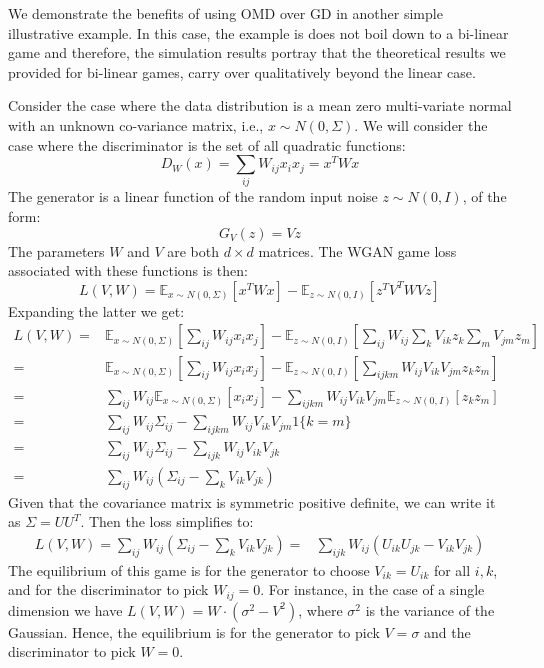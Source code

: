 
We demonstrate the benefits of using OMD over GD in another simple illustrative example. In this case, the example is does not boil down to a bi-linear game and therefore, the simulation results portray that the theoretical results we provided for bi-linear games, carry over qualitatively beyond the linear case.

Consider the case where the data distribution is a mean zero multi-variate normal with an unknown co-variance matrix, i.e., $x \sim N(0, \Sigma)$. We will consider the case where the discriminator is the set of all quadratic functions:
\begin{equation}
D_W(x) = \sum_{ij} W_{ij} x_i x_j = x^T W x 
\end{equation}
The generator is a linear function of the random input noise $z\sim N(0, I)$, of the form:
\begin{equation}
G_V(z) = V z
\end{equation}
The parameters $W$ and $V$ are both $d\times d$ matrices. The WGAN game loss associated with these functions is then:
\begin{equation}
L(V, W)= \mathbb{E}_{x\sim N(0, \Sigma)}\left[ x^T W x \right] - \mathbb{E}_{z\sim N(0,I)}\left[z^T V^T W V z \right] 
\end{equation}
Expanding the latter we get:
\begin{align*}
L(V, W)=& \mathbb{E}_{x\sim N(0, \Sigma)}\left[ \sum_{ij} W_{ij} x_i x_j \right] - \mathbb{E}_{z\sim N(0,I)}\left[ \sum_{ij} W_{ij} \sum_{k} V_{ik} z_k  \sum_{m} V_{jm} z_m\right] \\
=&
\mathbb{E}_{x\sim N(0, \Sigma)}\left[ \sum_{ij} W_{ij} x_i x_j \right] - \mathbb{E}_{z\sim N(0,I)}\left[ \sum_{ijkm} W_{ij} V_{ik} V_{jm} z_k z_m \right]\\
=& \sum_{ij} W_{ij} \mathbb{E}_{x\sim N(0, \Sigma)}\left[ x_i x_j \right] - \sum_{ijkm} W_{ij} V_{ik} V_{jm} \mathbb{E}_{z\sim N(0,I)}\left[ z_k z_m \right]\\
=& \sum_{ij} W_{ij} \Sigma_{ij} - \sum_{ijkm} W_{ij} V_{ik} V_{jm} 1\{k=m\}\\
=& \sum_{ij} W_{ij} \Sigma_{ij} - \sum_{ijk} W_{ij} V_{ik} V_{jk}\\
=& \sum_{ij} W_{ij} \left(\Sigma_{ij} - \sum_{k} V_{ik} V_{jk}\right)
\end{align*}
Given that the covariance matrix is symmetric positive definite, we can write it as $\Sigma = U U^T$. Then the loss simplifies to:
\begin{align}
L(V, W) = \sum_{ij} W_{ij} \left(\Sigma_{ij} - \sum_{k} V_{ik} V_{jk}\right) =& \sum_{ijk} W_{ij} \left(U_{ik} U_{jk} -  V_{ik} V_{jk}\right)
\end{align}
The equilibrium of this game is for the generator to choose $V_{ik} = U_{ik}$ for all $i,k$, and for the discriminator to pick $W_{ij}=0$. For instance, in the case of a single dimension we have $L(V,W) = W\cdot (\sigma^2 - V^2)$, where $\sigma^2$ is the variance of the Gaussian. Hence, the equilibrium is for the generator to pick $V=\sigma$ and the discriminator to pick $W=0$.

